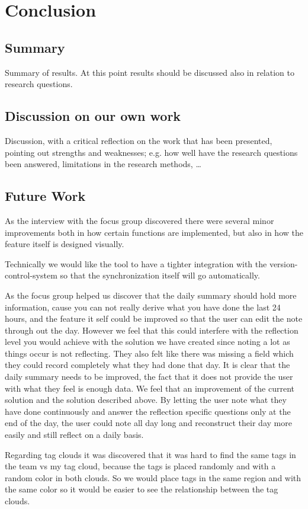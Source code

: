 \chapter{Conclusion}

\section{Summary}
Summary of results. At this point results should be discussed also in
relation to research questions.

\section{Discussion on our own work}
Discussion, with a critical reflection on the work that has been presented,
pointing out strengths and weaknesses; e.g. how well have the research questions been answered, limitations in the research methods, …

\section{Future Work}
As the interview with the focus group discovered there were several minor improvements both in how certain functions are implemented, but also in how the feature itself is designed visually. 

Technically we would like the tool to have a tighter integration with the version-control-system so that the synchronization itself will go automatically.

As the focus group helped us discover that the daily summary should hold more information, cause you can not really derive what you have done the last 24 hours, and the feature it self could be improved so that the user can edit the note through out the day. However we feel that this could interfere with the reflection level you would achieve with the solution we have created since noting a lot as things occur is not reflecting. They also felt like there was missing a field which they could record completely what they had done that day. It is clear that the daily summary needs to be improved, the fact that it does not provide the user with what they feel is enough data. We feel that an improvement of the current solution and the solution described above. By letting the user note what they have done continuously and answer the reflection specific questions only at the end of the day, the user could note all day long and reconstruct their day more easily and still reflect on a daily basis.

Regarding tag clouds it was discovered that it was hard to find the same tags in the team vs my tag cloud, because the tags is placed randomly and with a random color in both clouds. So we would place tags in the same region and with the same color so it would be  easier to see the relationship between the tag clouds.

